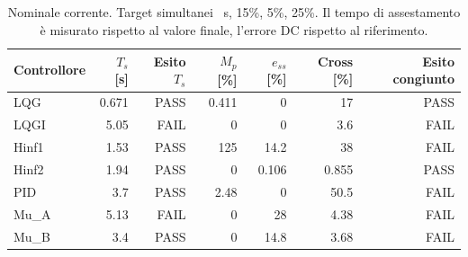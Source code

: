 \begin{table}[htbp]\centering\small
\setlength{\tabcolsep}{4pt}
\begin{tabular}{lrrrrrr}\toprule
Controllore & $T_s$ [s] & Esito $T_s$ & $M_p$ [\%] & $e_{ss}$ [\%] & Cross [\%] & Esito congiunto\\\midrule
LQG & \num{0.671} & PASS & \num{0.411} & 0 & \num{17} & PASS\\
LQGI & \num{5.05} & FAIL & \num{0} & 0 & \num{3.6} & FAIL\\
Hinf1 & \num{1.53} & PASS & \num{125} & \num{14.2} & \num{38} & FAIL\\
Hinf2 & \num{1.94} & PASS & \num{0} & \num{0.106} & \num{0.855} & PASS\\
PID & \num{3.7} & PASS & \num{2.48} & 0 & \num{50.5} & FAIL\\
Mu\_A & \num{5.13} & FAIL & \num{0} & \num{28} & \num{4.38} & FAIL\\
Mu\_B & \num{3.4} & PASS & \num{0} & \num{14.8} & \num{3.68} & FAIL\\
\bottomrule\end{tabular}
\caption{Nominale corrente. Target simultanei \FinTsLimit\ s, 15\%, 5\%, 25\%. Il tempo di assestamento è misurato rispetto al valore finale, l'errore DC rispetto al riferimento.}
\label{tab:quattro-target}
\end{table}
